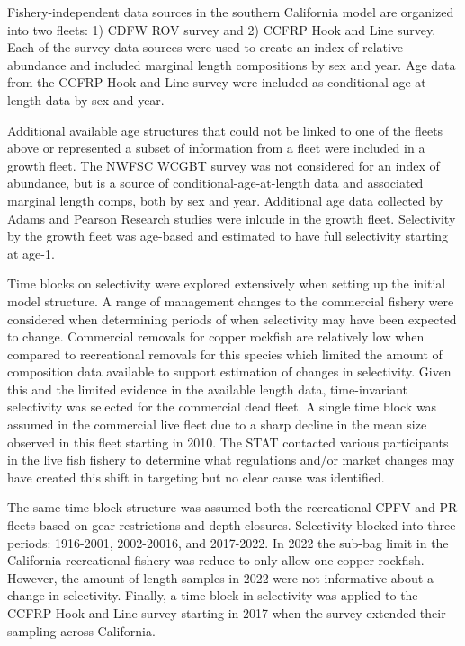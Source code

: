 \documentclass[11pt,
  english,
  letterpaper,
]{article}
\begin{document}
Fishery-independent data sources in the southern California model are organized into two fleets: 1) CDFW ROV survey and 2) CCFRP Hook and Line survey. Each of the survey data sources were used to create an index of relative abundance and included marginal length compositions by sex and year. Age data from the CCFRP Hook and Line survey were included as conditional-age-at-length data by sex and year.

Additional available age structures that could not be linked to one of the fleets above or represented a subset of information from a fleet were included in a growth fleet. The NWFSC WCGBT survey was not considered for an index of abundance, but is a source of conditional-age-at-length data and associated marginal length comps, both by sex and year. Additional age data collected by Adams and Pearson Research studies were inlcude in the growth fleet. Selectivity by the growth fleet was age-based and estimated to have full selectivity starting at age-1.

Time blocks on selectivity were explored extensively when setting up the initial model structure. A range of management changes to the commercial fishery were considered when determining periods of when selectivity may have been expected to change. Commercial removals for copper rockfish are relatively low when compared to recreational removals for this species which limited the amount of composition data available to support estimation of changes in selectivity. Given this and the limited evidence in the available length data, time-invariant selectivity was selected for the commercial dead fleet. A single time block was assumed in the commercial live fleet due to a sharp decline in the mean size observed in this fleet starting in 2010. The STAT contacted various participants in the live fish fishery to determine what regulations and/or market changes may have created this shift in targeting but no clear cause was identified.

The same time block structure was assumed both the recreational CPFV and PR fleets based on gear restrictions and depth closures. Selectivity blocked into three periods: 1916-2001, 2002-20016, and 2017-2022. In 2022 the sub-bag limit in the California recreational fishery was reduce to only allow one copper rockfish. However, the amount of length samples in 2022 were not informative about a change in selectivity. Finally, a time block in selectivity was applied to the CCFRP Hook and Line survey starting in 2017 when the survey extended their sampling across California.
\end{document}
